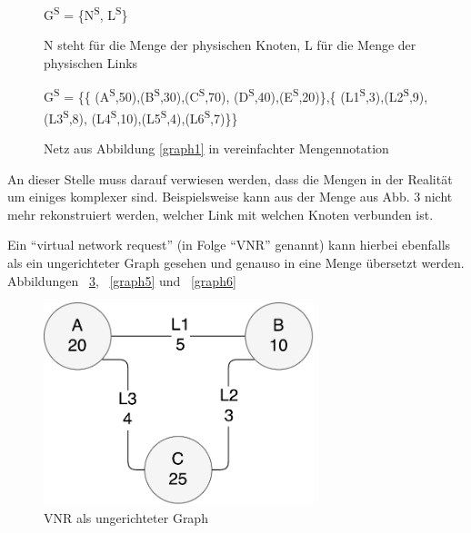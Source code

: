 \documentclass{lni}
\begin{document}
\begin{figure}[htb]
\begin{center}
G\textsuperscript{S} = \{N\textsuperscript{S}, L\textsuperscript{S}\}
\caption{\label{graph2}N steht für die Menge der physischen Knoten, L für die Menge der physischen Links}
\end{center}
\end{figure}

\begin{figure}[htb]
\begin{center}
\hspace{1.0cm}
G\textsuperscript{S} = \{\{
(A\textsuperscript{S},50),(B\textsuperscript{S},30),(C\textsuperscript{S},70),
(D\textsuperscript{S},40),(E\textsuperscript{S},20)\},\newline\{
(L1\textsuperscript{S},3),(L2\textsuperscript{S},9),(L3\textsuperscript{S},8),
(L4\textsuperscript{S},10),(L5\textsuperscript{S},4),(L6\textsuperscript{S},7)\}\}
\caption{\label{graph3} Netz aus Abbildung \ref{graph1} in vereinfachter Mengennotation}
\end{center}
\end{figure}

An dieser Stelle muss darauf verwiesen werden, dass die Mengen in der Realität um einiges komplexer sind. Beispielsweise kann aus der Menge aus Abb. 3 nicht mehr rekonstruiert werden, welcher Link mit welchen Knoten verbunden ist.
\newpage



Ein "`virtual network request"' (in Folge "`VNR"' genannt) kann hierbei ebenfalls als ein ungerichteter Graph gesehen und genauso in eine Menge übersetzt werden. Abbildungen ~\ref{graph4}, ~\ref{graph5} und ~\ref{graph6}

\begin{figure}[htb]
\begin{center}
\hspace{0.8cm}
\includegraphics[width=0.7\textwidth]{VNR1.pdf}\newline
\caption{\label{graph4}VNR als ungerichteter Graph}
\end{center}
\end{figure}
\end{document}
